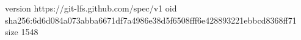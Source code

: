 version https://git-lfs.github.com/spec/v1
oid sha256:6d6d084a073abba6671df7a4986e38d5f6508fff6e428893221ebbcd8368ff71
size 1548
